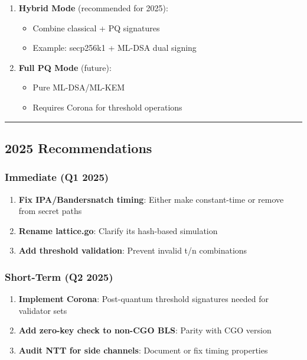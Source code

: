 \documentclass[
]{article}
\providecommand{\tightlist}{%
  \setlength{\itemsep}{0pt}\setlength{\parskip}{0pt}}
\begin{document}
\begin{enumerate}
\def\labelenumi{\arabic{enumi}.}
\item
  \textbf{Hybrid Mode} (recommended for 2025):

  \begin{itemize}
  \tightlist
  \item
    Combine classical + PQ signatures
  \item
    Example: secp256k1 + ML-DSA dual signing
  \end{itemize}
\item
  \textbf{Full PQ Mode} (future):

  \begin{itemize}
  \tightlist
  \item
    Pure ML-DSA/ML-KEM
  \item
    Requires Corona for threshold operations
  \end{itemize}
\end{enumerate}

\begin{center}\rule{0.5\linewidth}{0.5pt}\end{center}

\subsection{2025 Recommendations}\label{2025-recommendations}

\subsubsection{Immediate (Q1 2025)}\label{immediate-q1-2025}

\begin{enumerate}
\def\labelenumi{\arabic{enumi}.}
\tightlist
\item
  \textbf{Fix IPA/Bandersnatch timing}: Either make constant-time or
  remove from secret paths
\item
  \textbf{Rename lattice.go}: Clarify it\textquotesingle s hash-based
  simulation
\item
  \textbf{Add threshold validation}: Prevent invalid t/n combinations
\end{enumerate}

\subsubsection{Short-Term (Q2 2025)}\label{short-term-q2-2025}

\begin{enumerate}
\def\labelenumi{\arabic{enumi}.}
\setcounter{enumi}{3}
\tightlist
\item
  \textbf{Implement Corona}: Post-quantum threshold signatures needed
  for validator sets
\item
  \textbf{Add zero-key check to non-CGO BLS}: Parity with CGO version
\item
  \textbf{Audit NTT for side channels}: Document or fix timing
  properties
\end{enumerate}
\end{document}
